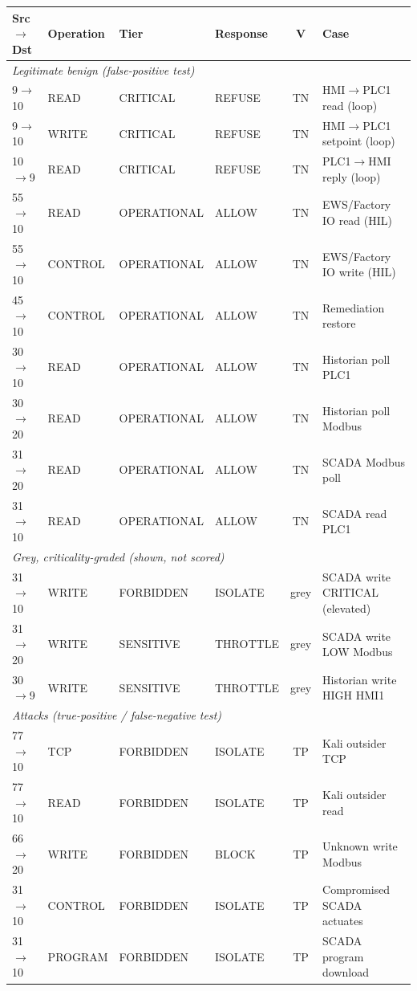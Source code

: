 \begin{table}[t]
\centering
\footnotesize
\begin{tabular}{llllcl}
\hline
Src$\to$Dst & Operation & Tier & Response & V & Case \\
\hline
\multicolumn{6}{l}{\textit{Legitimate benign (false-positive test)}} \\
9$\to$10 & READ & CRITICAL & REFUSE & TN & HMI$\to$PLC1 read (loop) \\
9$\to$10 & WRITE & CRITICAL & REFUSE & TN & HMI$\to$PLC1 setpoint (loop) \\
10$\to$9 & READ & CRITICAL & REFUSE & TN & PLC1$\to$HMI reply (loop) \\
55$\to$10 & READ & OPERATIONAL & ALLOW & TN & EWS/Factory IO read (HIL) \\
55$\to$10 & CONTROL & OPERATIONAL & ALLOW & TN & EWS/Factory IO write (HIL) \\
45$\to$10 & CONTROL & OPERATIONAL & ALLOW & TN & Remediation restore \\
30$\to$10 & READ & OPERATIONAL & ALLOW & TN & Historian poll PLC1 \\
30$\to$20 & READ & OPERATIONAL & ALLOW & TN & Historian poll Modbus \\
31$\to$20 & READ & OPERATIONAL & ALLOW & TN & SCADA Modbus poll \\
31$\to$10 & READ & OPERATIONAL & ALLOW & TN & SCADA read PLC1 \\
\multicolumn{6}{l}{\textit{Grey, criticality-graded (shown, not scored)}} \\
31$\to$10 & WRITE & FORBIDDEN & ISOLATE & grey & SCADA write CRITICAL (elevated) \\
31$\to$20 & WRITE & SENSITIVE & THROTTLE & grey & SCADA write LOW Modbus \\
30$\to$9 & WRITE & SENSITIVE & THROTTLE & grey & Historian write HIGH HMI1 \\
\multicolumn{6}{l}{\textit{Attacks (true-positive / false-negative test)}} \\
77$\to$10 & TCP & FORBIDDEN & ISOLATE & TP & Kali outsider TCP \\
77$\to$10 & READ & FORBIDDEN & ISOLATE & TP & Kali outsider read \\
66$\to$20 & WRITE & FORBIDDEN & BLOCK & TP & Unknown write Modbus \\
31$\to$10 & CONTROL & FORBIDDEN & ISOLATE & TP & Compromised SCADA actuates \\
31$\to$10 & PROGRAM & FORBIDDEN & ISOLATE & TP & SCADA program download \\

\end{tabular}
\end{table}
